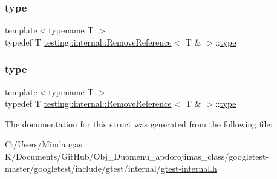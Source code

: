 \mbox{\label{structtesting_1_1internal_1_1_remove_reference_3_01_t_01_6_01_4_a3d0f32a66759f333c2dd66aa31005e6d}} 
\subsubsection{\texorpdfstring{type}{type}\hspace{0.1cm}{\footnotesize\ttfamily [2/3]}}
{\footnotesize\ttfamily template$<$typename T $>$ \\
typedef T \mbox{\hyperlink{structtesting_1_1internal_1_1_remove_reference}{testing\+::internal\+::\+Remove\+Reference}}$<$ T \& $>$\+::\mbox{\hyperlink{structtesting_1_1internal_1_1_remove_reference_3_01_t_01_6_01_4_a3d0f32a66759f333c2dd66aa31005e6d}{type}}}

\mbox{\label{structtesting_1_1internal_1_1_remove_reference_3_01_t_01_6_01_4_a3d0f32a66759f333c2dd66aa31005e6d}} 
\subsubsection{\texorpdfstring{type}{type}\hspace{0.1cm}{\footnotesize\ttfamily [3/3]}}
{\footnotesize\ttfamily template$<$typename T $>$ \\
typedef T \mbox{\hyperlink{structtesting_1_1internal_1_1_remove_reference}{testing\+::internal\+::\+Remove\+Reference}}$<$ T \& $>$\+::\mbox{\hyperlink{structtesting_1_1internal_1_1_remove_reference_3_01_t_01_6_01_4_a3d0f32a66759f333c2dd66aa31005e6d}{type}}}



The documentation for this struct was generated from the following file\+:\begin{DoxyCompactItemize}
\item 
C\+:/\+Users/\+Mindaugas K/\+Documents/\+Git\+Hub/\+Obj\+\_\+\+Duomenu\+\_\+apdorojimas\+\_\+class/googletest-\/master/googletest/include/gtest/internal/\mbox{\hyperlink{googletest-master_2googletest_2include_2gtest_2internal_2gtest-internal_8h}{gtest-\/internal.\+h}}\end{DoxyCompactItemize}

